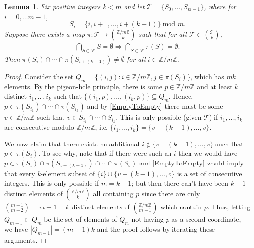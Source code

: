 \documentclass[journal, onecolumn]{IEEEtran}
\newtheorem{lemma}{Lemma}
\begin{document}

\begin{lemma}\label{NonEmptyLemma} Fix positive integers $k < m$ and let $\mathcal{T} = \{S_0,\ldots,S_{m-1}\}$, where for $i = 0, \ldots m -1$,
\[S_{i} = \{i, i + 1, \ldots, i + (k-1)\}  \ \text{mod } m.\]
Suppose there exists a map $\pi: \mathcal{T} \to {\mathbb{Z}/m\mathbb{Z} \choose k}$ such that for all $ \mathcal{F} \in {\mathcal{T} \choose k}$,
\begin{align}\label{EmptyToEmpty}
 \bigcap_{S \in \mathcal{F}} S = \emptyset \Longrightarrow \bigcap_{S \in \mathcal{F}} \pi(S) = \emptyset.
\end{align}
%
Then  $\pi(S_i) \cap \cdots \cap \pi(S_{i+(k-1)}) \neq \emptyset$ for all $i \in \mathbb{Z}/m\mathbb{Z}$.
\end{lemma}

\begin{proof} Consider the set $Q_m = \{ (i,j) : i \in \mathbb{Z}/m\mathbb{Z}, j \in \pi(S_i) \}$, which has $mk$ elements. By the pigeon-hole principle, there is some $p \in \mathbb{Z}/m\mathbb{Z}$ and at least $k$ distinct $i_1, \ldots, i_k$ such that $\{(i_1, p), \ldots, (i_k, p)\} \subseteq Q_m$. Hence, $p \in \pi(S_{i_1}) \cap \cdots \cap \pi(S_{i_k})$ and by \eqref{EmptyToEmpty} there must be some $v \in \mathbb{Z}/m\mathbb{Z}$ such that $v \in S_{i_1} \cap \cdots \cap S_{i_k}$. This is only possible (given $\mathcal{T}$) if $i_1, \ldots, i_k$ are consecutive modulo $\mathbb{Z}/m\mathbb{Z}$, i.e. $\{i_1, \ldots, i_k\} = \{v - (k-1), \ldots, v\}$. 

We now claim that there exists no additional $i \notin \{v - (k-1), \ldots, v\}$ such that $p \in \pi(S_{i})$. To see why, note that if there were such an $i$ then we would have $p \in \pi(S_{i}) \cap \pi(S_{v - (k-1)}) \cap \cdots \cap \pi(S_{v})$ and \eqref{EmptyToEmpty} would imply that every $k$-element subset of $\{i\} \cup \{v-(k-1), \ldots, v\}$ is a set of consecutive integers. This is only possible if $m = k+1$; but then there can't have been $k+1$ distinct elements of ${\mathbb{Z}/m\mathbb{Z} \choose k}$ all containing $p$ since there are only ${m-1 \choose m-2}  = m-1 = k$ distinct elements of ${\mathbb{Z}/m\mathbb{Z} \choose m-1}$ which contain $p$. Thus, letting $Q_{m-1} \subset Q_m$ be the set of elements of $Q_m$ not having $p$ as a second coordinate, we have $|Q_{m-1}| = (m-1)k$ and the proof follows by iterating these arguments.
\end{proof}

\end{document}
